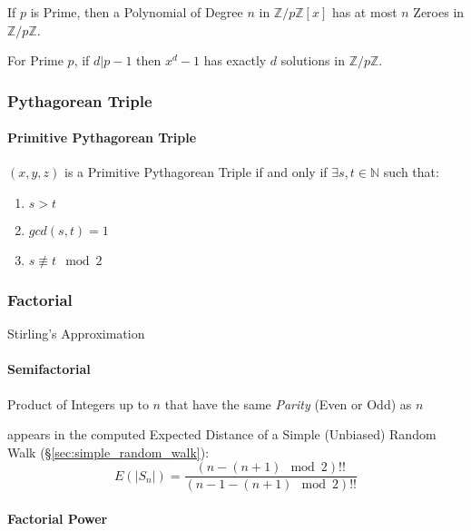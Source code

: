 If $p$ is Prime, then a Polynomial of Degree $n$ in
$\mathbb{Z}/p\mathbb{Z}[x]$ has at most $n$ Zeroes in
$\mathbb{Z}/p\mathbb{Z}$.

For Prime $p$, if $d|p-1$ then $x^d - 1$ has exactly $d$ solutions in
$\mathbb{Z}/p\mathbb{Z}$.



\subsubsection{Pythagorean Triple}\label{sec:pythagorean_triple}

\paragraph{Primitive Pythagorean Triple}\label{sec:primitive_pythagorean}\hfill

$(x,y,z)$ is a Primitive Pythagorean Triple if and only if $\exists
s,t \in \mathbb{N}$ such that:
\begin{enumerate}
  \item $s > t$
  \item $gcd (s,t) = 1$
  \item $s \not\equiv t \mod 2$
\end{enumerate}



\subsubsection{Factorial}\label{sec:factorial}

Stirling's Approximation



\paragraph{Semifactorial}\label{sec:semifactorial}\hfill

Product of Integers up to $n$ that have the same \emph{Parity} (Even or Odd) as
$n$

appears in the computed Expected Distance of a Simple (Unbiased) Random Walk
(\S\ref{sec:simple_random_walk}):
\[
  E(|S_n|) = \frac{(n - (n+1)\mod{2})!!}{(n - 1 - (n+1)\mod{2})!!}
\]



\paragraph{Factorial Power}\label{sec:factorial_power}\hfill

